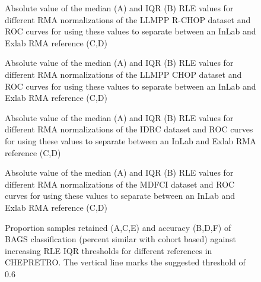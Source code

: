 \documentclass{article}
\begin{document}
\begin{figure}[!h]
	\begin{center}
	\end{center}
	\caption{Absolute value of the median (A) and IQR (B) RLE values for different RMA normalizations of the LLMPP R-CHOP dataset and ROC curves for using these values to separate between an InLab and Exlab RMA reference (C,D)}
	\label{fig:rchop_rle}
\end{figure}

\begin{figure}[!h]
	\begin{center}
	\end{center}
	\caption{Absolute value of the median (A) and IQR (B) RLE values for different RMA normalizations of the LLMPP CHOP dataset and ROC curves for using these values to separate between an InLab and Exlab RMA reference (C,D)}
	\label{fig:chop_rle}
\end{figure}

\begin{figure}[!h]
	\begin{center}
	\end{center}
	\caption{Absolute value of the median (A) and IQR (B) RLE values for different RMA normalizations of the IDRC dataset and ROC curves for using these values to separate between an InLab and Exlab RMA reference (C,D)}
	\label{fig:idrc_rle}
\end{figure}

\begin{figure}[!h]
	\begin{center}
	\end{center}
	\caption{Absolute value of the median (A) and IQR (B) RLE values for different RMA normalizations of the MDFCI dataset and ROC curves for using these values to separate between an InLab and Exlab RMA reference (C,D)}
	\label{fig:mdfci_rle}
\end{figure}



\begin{figure}
	\begin{center}
	\end{center}
	\caption{Proportion samples retained (A,C,E) and accuracy (B,D,F) of BAGS classification (percent similar with cohort based) against increasing RLE IQR thresholds for different references in CHEPRETRO. The vertical line marks the suggested threshold of 0.6}
	\label{fig:chep_rle_clas_bags}
\end{figure}
\end{document}
